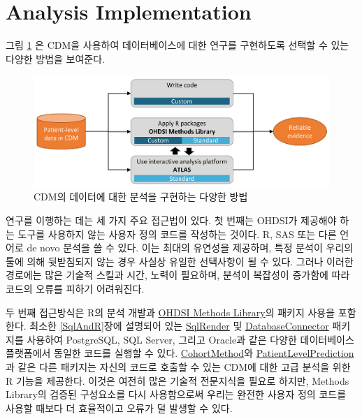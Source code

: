 \documentclass[11pt]{book}
\theoremstyle{definition}
\theoremstyle{definition}
\theoremstyle{definition}
\theoremstyle{remark}
\begin{document}
\section{Analysis Implementation}\label{analysisImplementation}

그림 \ref{fig:implementations} 은 CDM을 사용하여 데이터베이스에 대한
연구를 구현하도록 선택할 수 있는 다양한 방법을 보여준다.

\begin{figure}

{\centering \includegraphics[width=0.9\linewidth]{images/OhdsiAnalyticsTools/implementations} 

}

\caption{CDM의 데이터에 대한 분석을 구현하는 다양한 방법}\label{fig:implementations}
\end{figure}

연구를 이행하는 데는 세 가지 주요 접근법이 있다. 첫 번째는 OHDSI가
제공해야 하는 도구를 사용하지 않는 사용자 정의 코드를 작성하는 것이다.
R, SAS 또는 다른 언어로 de novo 분석을 쓸 수 있다. 이는 최대의 유연성을
제공하며, 특정 분석이 우리의 툴에 의해 뒷받침되지 않는 경우 사실상
유일한 선택사항이 될 수 있다. 그러나 이러한 경로에는 많은 기술적 스킬과
시간, 노력이 필요하며, 분석이 복잡성이 증가함에 따라 코드의 오류를
피하기 어려워진다.

두 번째 접근방식은 R의 분석 개발과
\href{https://ohdsi.github.io/MethodsLibrary/}{OHDSI Methods Library}의
패키지 사용을 포함한다. 최소한 \ref{SqlAndR}장에 설명되어 있는
\href{https://ohdsi.github.io/SqlRender/}{SqlRender} 및
\href{https://ohdsi.github.io/DatabaseConnector/}{DatabaseConnector}
패키지를 사용하여 PostgreSQL, SQL Server, 그리고 Oracle과 같은 다양한
데이터베이스 플랫폼에서 동일한 코드를 실행할 수 있다.
\href{https://ohdsi.github.io/CohortMethod/}{CohortMethod}와
\href{https://ohdsi.github.io/PatientLevelPrediction/}{PatientLevelPrediction}과
같은 다른 패키지는 자신의 코드로 호출할 수 있는 CDM에 대한 고급 분석을
위한 R 기능을 제공한다. 이것은 여전히 많은 기술적 전문지식을 필요로
하지만, Methods Library의 검증된 구성요소를 다시 사용함으로써 우리는
완전한 사용자 정의 코드를 사용할 때보다 더 효율적이고 오류가 덜 발생할
수 있다.
\end{document}
